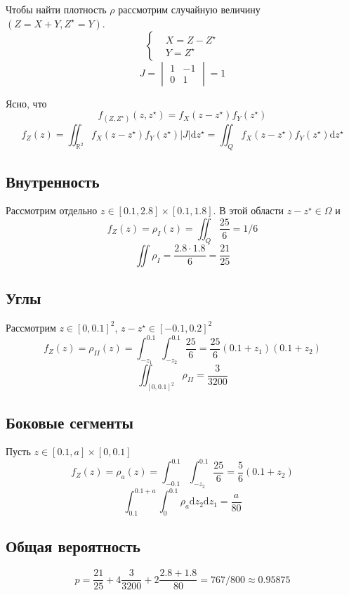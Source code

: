 \documentclass{article}
\providecommand{\RR}{\mathbb{R}}
\begin{document}
Чтобы найти плотность \( \rho \) рассмотрим случайную величину \( (Z=X+Y, Z^\star = Y ) \).
\[\left\{\begin{aligned}
    & X = Z - Z^\star \\
    & Y = Z^\star
\end{aligned}\right.\]
\[ J = \begin{vmatrix}
    1 & -1 \\
    0 & 1
\end{vmatrix} = 1 \]

Ясно, что
\[
    f_{(Z,Z^\star)}(z,z^\star) = f_X(z-z^\star) f_Y(z^\star)
\]
\[
    f_Z(z) = \iint_{\RR^2} f_X(z - z^\star) f_Y(z^\star) \left|J\right| \mathrm{d} z^\star
    = \iint_Q f_X(z - z^\star) f_Y(z^\star) \mathrm{d} z^\star
\]

\subsection{Внутренность}
Рассмотрим отдельно \( z\in [0.1, 2.8]\times [0.1, 1.8] \).
В этой области \( z - z^\star \in \Omega \) и
\[
    f_Z(z) = \rho_I(z) = \iint_Q \frac{25}{6} = 1/6
\]
\[ \iint \rho_I = \frac{2.8\cdot 1.8}{6} = \frac{21}{25} \]

\subsection{Углы}
Рассмотрим \( z\in [0, 0.1]^2 \), \( z-z^\star \in [-0.1,0.2]^2 \)
\[
    f_Z(z) = \rho_{II}(z) = \int_{-z_1}^{0.1} \int_{-z_2}^{0.1} \frac{25}{6} = \frac{25}{6}(0.1+z_1)(0.1+z_2)
\]
\[
    \iint_{[0,0.1]^2} \rho_{II} = \frac{3}{3200}
    \]
\subsection{Боковые сегменты}
Пусть \( z\in [0.1, a]\times [0, 0.1] \)
\[
    f_Z(z) = \rho_{a}(z) = \int_{-0.1}^{0.1} \int_{-z_2}^{0.1} \frac{25}{6} = \frac{5}{6}(0.1 + z_2)
\]
\[
    \int_{0.1}^{0.1+a}\int_{0}^{0.1} \rho_a \mathrm{d}z_2 \mathrm{d} z_1 = \frac{a}{80}
    \]

\subsection{Общая вероятность}
\[
    p = \frac{21}{25} + 4\frac{3}{3200} + 2\frac{2.8+1.8}{80} = 767/800 \approx 0.95875
    \]
\end{document}
